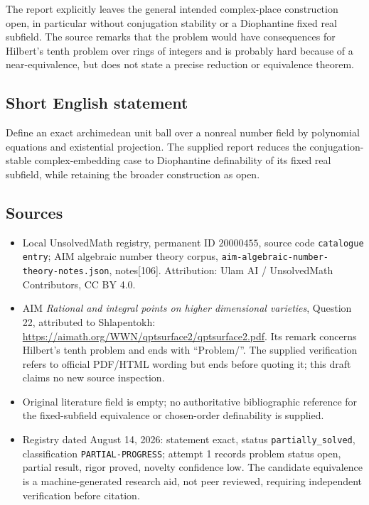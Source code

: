 \documentclass[11pt]{article}
\begin{document}
The report explicitly leaves the general intended complex-place construction open, in particular without conjugation stability or a Diophantine fixed real subfield. The source remarks that the problem would have consequences for Hilbert's tenth problem over rings of integers and is probably hard because of a near-equivalence, but does not state a precise reduction or equivalence theorem.
\subsection{Short English statement}
Define an exact archimedean unit ball over a nonreal number field by polynomial equations and existential projection. The supplied report reduces the conjugation-stable complex-embedding case to Diophantine definability of its fixed real subfield, while retaining the broader construction as open.
\subsection{Sources}
\begin{itemize}
\item Local UnsolvedMath registry, permanent ID \(20000455\), source code \texttt{catalogue entry}; AIM algebraic number theory corpus, \texttt{aim-algebraic-number-theory-notes.json}, notes[106]. Attribution: Ulam AI / UnsolvedMath Contributors, CC BY 4.0.
\item AIM \emph{Rational and integral points on higher dimensional varieties}, Question 22, attributed to Shlapentokh: \url{https://aimath.org/WWN/qptsurface2/qptsurface2.pdf}. Its remark concerns Hilbert's tenth problem and ends with ``Problem/''. The supplied verification refers to official PDF/HTML wording but ends before quoting it; this draft claims no new source inspection.
\item Original literature field is empty; no authoritative bibliographic reference for the fixed-subfield equivalence or chosen-order definability is supplied.
\item Registry dated August 14, 2026: statement exact, status \texttt{partially\_solved}, classification \texttt{PARTIAL-PROGRESS}; attempt 1 records problem status open, partial result, rigor proved, novelty confidence low. The candidate equivalence is a machine-generated research aid, not peer reviewed, requiring independent verification before citation.
\end{itemize}
\end{document}
